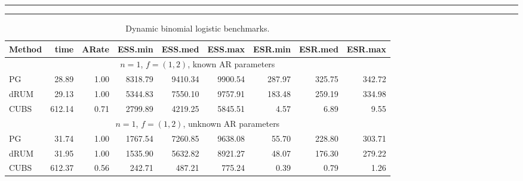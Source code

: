 \documentclass[12pt]{article}
\begin{document}
\begin{table}

  \begin{center}
    \caption{\label{tab:dynlogit-detail} Dynamic binomial logistic benchmarks.}
    \hrule
    \vspace{2pt}
    \hrule
  \end{center}

  \small

  \begin{center}
    \begin{tabular}{l r r r r r r r r }
      Method  &    time  &   ARate  &  ESS.min  &  ESS.med  &  ESS.max  &
      ESR.min  &  ESR.med  &  ESR.max  \\
      \hline

      \multicolumn{9}{c}{$n=1$, $f = (1,2)$, known AR parameters} \\
      PG     &    28.89 &     1.00 &   8318.79 &   9410.34 &   9900.54 &    287.97 &    325.75 &    342.72 \\ 
      dRUM   &    29.13 &     1.00 &   5344.83 &   7550.10 &   9757.91 &    183.48 &    259.19 &    334.98 \\
      CUBS   &   612.14 &     0.71 &   2799.89 &   4219.25 &   5845.51 &      4.57 &      6.89 &      9.55
      \\ %


      \multicolumn{9}{c}{$n=1$, $f = (1,2)$, unknown AR parameters} \\

      PG     &    31.74 &     1.00 &   1767.54 &   7260.85 &   9638.08 &     55.70 &    228.80 &    303.71 \\ 
      dRUM   &    31.95 &     1.00 &   1535.90 &   5632.82 &   8921.27 &     48.07 &    176.30 &    279.22 \\
      CUBS   &   612.37 &     0.56 &    242.71 &    487.21 &    775.24 &      0.39 &      0.79 &      1.26
      \\ %


\end{tabular}
\end{center}
\end{table}
\end{document}
